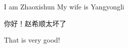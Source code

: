 \documentclass{}
\begin{document}
I am Zhaoxishun
My wife is Yangyongli

你好！赵希顺太坏了

That is very good!
\end{document}
